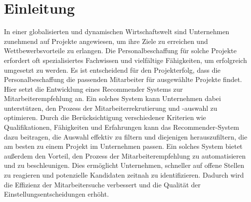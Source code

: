 \chapter{Einleitung}
\label{chap:einleitung}
In einer globalisierten und dynamischen Wirtschaftswelt sind Unternehmen zunehmend auf Projekte angewiesen, um ihre Ziele zu erreichen und Wettbewerbsvorteile zu erlangen. Die Personalbeschaffung für solche Projekte erfordert oft spezialisiertes Fachwissen und vielfältige Fähigkeiten, um erfolgreich umgesetzt zu werden. Es ist entscheidend für den Projekterfolg, dass die Personalbeschaffung die passenden Mitarbeiter für ausgewählte Projekte findet. Hier setzt die Entwicklung eines Recommender Systems zur Mitarbeiterempfehlung an. Ein solches System kann Unternehmen dabei unterstützen, den Prozess der Mitarbeiterrekrutierung und -auswahl zu optimieren. Durch die Berücksichtigung verschiedener Kriterien wie Qualifikationen, Fähigkeiten und Erfahrungen kann das Recommender-System dazu beitragen, die Auswahl effektiv zu filtern und diejenigen herauszufiltern, die am besten zu einem Projekt im Unternehmen passen. Ein solches System bietet außerdem den Vorteil, den Prozess der Mitarbeiterempfehlung zu automatisieren und zu beschleunigen. Dies ermöglicht Unternehmen, schneller auf offene Stellen zu reagieren und potenzielle Kandidaten zeitnah zu identifizieren. Dadurch wird die Effizienz der Mitarbeitersuche verbessert und die Qualität der Einstellungsentscheidungen erhöht.\\

